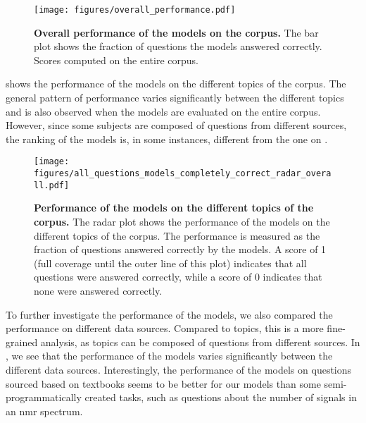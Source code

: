 \begin{figure}[htb]
    \centering
    \texttt{[image: figures/overall\_performance.pdf]}
    \caption{\textbf{Overall performance of the models on the \chembench corpus.} The bar plot shows the fraction of questions the models answered correctly. Scores computed on the entire \chembench corpus.}
    \label{fig:barplot_all_correct_all_questions}
\end{figure}

 shows the performance of the models on the different topics of the \chembench corpus.
The general pattern of performance varies significantly between the different topics and is also observed when the models are evaluated on the entire corpus.
However, since some subjects are composed of questions from different sources, the ranking of the models is, in some instances, different from the one on \chembenchmini.


\begin{figure}[htb]
    \centering
    \texttt{[image: figures/all\_questions\_models\_completely\_correct\_radar\_overall.pdf]}
    \caption{\textbf{Performance of the models on the different topics of the \chembench corpus.} The radar plot shows the performance of the models on the different topics of the \chembench corpus. The performance is measured as the fraction of questions answered correctly by the models.
    A score of 1 (full coverage until the outer line of this plot) indicates that all questions were answered correctly, while a score of 0 indicates that none were answered correctly.
    }
    \label{fig:all_questions_models_completely_correct_radar_overall}
\end{figure}




To further investigate the performance of the models, we also compared the performance on different data sources.
Compared to topics, this is a more fine-grained analysis, as topics can be composed of questions from different sources.
In , we see that the performance of the models varies significantly between the different data sources.
Interestingly, the performance of the models on questions sourced based on textbooks seems to be better for our models than some semi-programmatically created tasks, such as questions about the number of signals in an \gls{nmr} spectrum.


